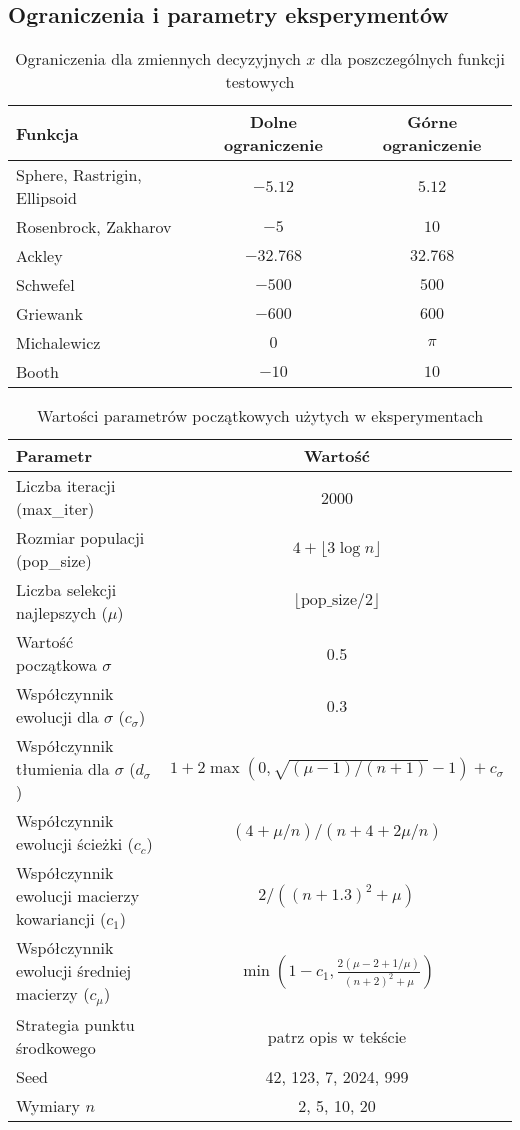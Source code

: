 \documentclass{article}
\begin{document}
\subsection{Ograniczenia i parametry eksperymentów}

\begin{table}[h]
\centering
\caption{Ograniczenia dla zmiennych decyzyjnych $x$ dla poszczególnych funkcji testowych}
\begin{tabular}{lcc}
\toprule
Funkcja & Dolne ograniczenie & Górne ograniczenie \\
\midrule
Sphere, Rastrigin, Ellipsoid & $-5.12$ & $5.12$ \\
Rosenbrock, Zakharov         & $-5$    & $10$ \\
Ackley                       & $-32.768$ & $32.768$ \\
Schwefel                     & $-500$  & $500$ \\
Griewank                     & $-600$  & $600$ \\
Michalewicz                  & $0$     & $\pi$ \\
Booth                        & $-10$   & $10$ \\
\bottomrule
\end{tabular}
\end{table}

\begin{table}[h]
\centering
\caption{Wartości parametrów początkowych użytych w eksperymentach}
\begin{tabular}{lc}
\toprule
Parametr & Wartość \\
\midrule
Liczba iteracji (max\_iter) & 2000 \\
Rozmiar populacji (pop\_size) & $4 + \lfloor 3 \log n \rfloor$ \\
Liczba selekcji najlepszych ($\mu$) & $\lfloor \text{pop\_size} / 2 \rfloor$ \\
Wartość początkowa $\sigma$ & 0.5 \\
Współczynnik ewolucji dla $\sigma$ ($c_\sigma$) & 0.3 \\
Współczynnik tłumienia dla $\sigma$ ($d_\sigma$) & $1 + 2 \max(0, \sqrt{(\mu-1)/(n+1)}-1) + c_\sigma$ \\
Współczynnik ewolucji ścieżki ($c_c$) & $(4 + \mu/n) / (n + 4 + 2\mu/n)$ \\
Współczynnik ewolucji macierzy kowariancji ($c_1$) & $2 / ((n+1.3)^2 + \mu)$ \\
Współczynnik ewolucji średniej macierzy ($c_\mu$) & $\min\left(1-c_1, \frac{2(\mu-2+1/\mu)}{(n+2)^2+\mu}\right)$ \\
Strategia punktu środkowego & patrz opis w tekście \\
Seed & 42, 123, 7, 2024, 999 \\
Wymiary $n$ & 2, 5, 10, 20 \\
\bottomrule
\end{tabular}
\end{table}
\end{document}

